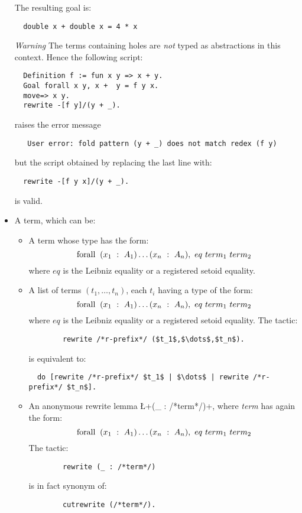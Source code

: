 \begin{itemize}
The resulting goal is:

\begin{lstlisting}
  double x + double x = 4 * x
\end{lstlisting}

\emph{Warning} The \ssr{} terms containing holes are \emph{not}
typed as abstractions in this context. Hence the following script:
\begin{lstlisting}
  Definition f := fun x y => x + y.
  Goal forall x y, x +  y = f y x.
  move=> x y.
  rewrite -[f y]/(y + _).
\end{lstlisting}
raises the error message
\begin{verbatim}
   User error: fold pattern (y + _) does not match redex (f y)
\end{verbatim}
but the script obtained by replacing the last line with:
\begin{lstlisting}
  rewrite -[f y x]/(y + _).
\end{lstlisting}
is valid.


\item A term, which can be:
  \begin{itemize}
    \item A term whose type has the form:
      $$\C{forall}\ (x_1\ :\ A_1)\dots(x_n\ :\ A_n),\ eq\ term_1\ term_2$$
      where $eq$ is the Leibniz equality or a registered setoid
      equality. %
    \item A list of terms $(t_1,\dots,t_n)$, each $t_i$ having a type of the
      form: $$\C{forall}\ (x_1\ :\ A_1)\dots(x_n\ :\ A_n),\ eq\ term_1\ term_2$$ where
      $eq$ is the Leibniz equality or a registered setoid
      equality. The tactic:
      \begin{lstlisting}
        rewrite /*r-prefix*/ ($t_1$,$\dots$,$t_n$).
      \end{lstlisting}
      is equivalent to:
\begin{lstlisting}
  do [rewrite /*r-prefix*/ $t_1$ | $\dots$ | rewrite /*r-prefix*/ $t_n$].
\end{lstlisting}
    \item An anonymous rewrite lemma
      \L+(_ : /*term*/)+, where \textit{term} has again the form:
      $$\C{forall}\ (x_1\ :\ A_1)\dots(x_n\ :\ A_n),\ eq\ term_1\ term_2$$
      The tactic:
      \begin{lstlisting}
        rewrite (_ : /*term*/)
      \end{lstlisting}
      is in fact synonym of:
      \begin{lstlisting}
        cutrewrite (/*term*/).
      \end{lstlisting}

  \end{itemize}

\end{itemize}




